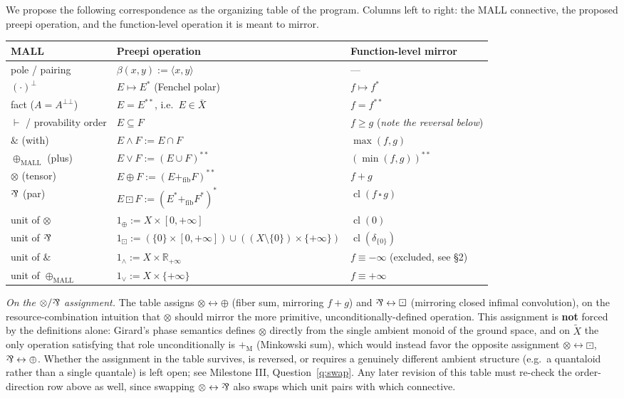 \documentclass[11pt]{article}
\newcommand{\Rp}{\mathbb R_{+\infty}}
\newcommand{\cl}{\operatorname{cl}}
\newcommand{\fibsum}{+_{\mathrm{fib}}}
\newcommand{\Msum}{+_{\mathrm M}}
\newcommand{\parr}{\mathbin{\text{\rotatebox[origin=c]{180}{\&}}}}
\begin{document}
We propose the following correspondence as the organizing table of the
program. Columns left to right: the MALL connective, the proposed preepi
operation, and the function-level operation it is meant to mirror.

\begin{center}
\begin{tabular}{lll}
\toprule
MALL & Preepi operation & Function-level mirror \\
\midrule
pole / pairing & $\beta(x,y):=\langle x,y\rangle$ & --- \\
$(\cdot)^\bot$ & $E\mapsto E^*$ (Fenchel polar) & $f\mapsto f^*$ \\
fact ($A=A^{\bot\bot}$) & $E=E^{**}$, i.e.\ $E\in\bar X$ & $f=f^{**}$ \\
$\vdash$ / provability order & $E\subseteq F$ & $f\ge g$ (\emph{note the reversal below}) \\
$\&$ (with) & $E\wedge F:=E\cap F$ & $\max(f,g)$ \\
$\oplus_{\mathrm{MALL}}$ (plus) & $E\vee F:=(E\cup F)^{**}$ & $(\min(f,g))^{**}$ \\
$\otimes$ (tensor) & $E\oplus F:=(E\fibsum F)^{**}$ & $f+g$ \\
$\parr$ (par) & $E\boxdot F:=(E^*\fibsum F^*)^*$ & $\cl(f\,\square\,g)$ \\
unit of $\otimes$ & $1_\oplus:=X\times[0,+\infty]$ & $\cl(0)$ \\
unit of $\parr$ & $1_\boxdot:=(\{0\}\times[0,+\infty])\cup((X\setminus\{0\})\times\{+\infty\})$ & $\cl(\delta_{\{0\}})$ \\
unit of $\&$ & $1_\wedge:=X\times\Rp$ & $f\equiv-\infty$ (excluded, see \S2) \\
unit of $\oplus_{\mathrm{MALL}}$ & $1_\vee:=X\times\{+\infty\}$ & $f\equiv+\infty$ \\
\bottomrule
\end{tabular}
\end{center}

\emph{On the $\otimes/\parr$ assignment.} The table assigns
$\otimes\leftrightarrow\oplus$ (fiber sum, mirroring $f+g$) and
$\parr\leftrightarrow\boxdot$ (mirroring closed infimal convolution), on the
resource-combination intuition that $\otimes$ should mirror the more
primitive, unconditionally-defined operation. This assignment is
\textbf{not} forced by the definitions alone: Girard's phase semantics
defines $\otimes$ directly from the single ambient monoid of the ground
space, and on $\tilde X$ the only operation satisfying that role
unconditionally is $\Msum$ (Minkowski sum), which would instead favor the
opposite assignment $\otimes\leftrightarrow\boxdot$, $\parr\leftrightarrow\oplus$.
Whether the assignment in the table survives, is reversed, or requires a
genuinely different ambient structure (e.g.\ a quantaloid rather than a
single quantale) is left open; see Milestone III,
Question~\ref{q:swap}. Any later revision of this table must re-check the
order-direction row above as well, since swapping $\otimes\leftrightarrow\parr$
also swaps which unit pairs with which connective.
\end{document}
